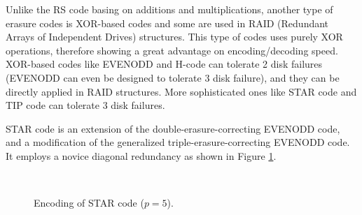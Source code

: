 \documentclass[sigconf]{acmart}
\begin{document}
Unlike the RS code basing on additions and multiplications, another type of erasure codes is XOR-based codes and some are used in RAID (Redundant Arrays of Independent Drives) structures. This type of codes uses purely XOR operations, therefore showing a great advantage on encoding/decoding speed. XOR-based codes like EVENODD \cite{EVENODD} and H-code \cite{hcode} can tolerate 2 disk failures (EVENODD can even be designed to tolerate 3 disk failure), and they can be directly applied in RAID structures. More sophisticated ones like STAR code \cite{STAR} and TIP code \cite{tip} can tolerate 3 disk failures.


STAR code \cite{STAR} is an extension of the double-erasure-correcting EVENODD \cite{EVENODD} code, and a modification of the generalized triple-erasure-correcting EVENODD code. It employs a novice diagonal redundancy as shown in Figure \ref{fig:star-enc}.
\begin{figure}[!ht]
 \centering
 \hspace{5pt}
  \\
 \hspace{5pt}
 \caption{Encoding of STAR code ($p = 5$).}
 \label{fig:star-enc}
\end{figure}
\end{document}
